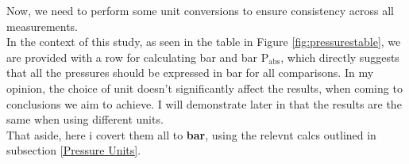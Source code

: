 \documentclass{article}
\begin{document}
\newpage
Now, we need to perform some unit conversions to ensure consistency across all measurements.\\[8pt]
In the context of this study, as seen in the table in Figure \ref{fig:pressurestable}, we are provided with a row for calculating bar and bar \(\text{P}_\text{abs}\), which directly suggests that all the pressures should be expressed in bar for all comparisons. In my opinion, the choice of unit doesn't significantly affect the results, when coming to conclusions we aim to achieve. I will demonstrate later in that the results are the same when using different units.\\[8pt]
That aside, here i covert them all to \textbf{bar}, using the relevnt calcs outlined in subsection \ref{Pressure Units}.

	\begin{center}
	\hspace*{0em}\begin{minipage}{0.46\textwidth}\centering		
		\hspace*{-1em}
\end{minipage}
\end{center}
\end{document}
